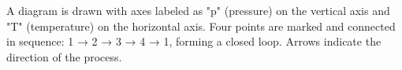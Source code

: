A diagram is drawn with axes labeled as "p" (pressure) on the vertical axis and "T" (temperature) on the horizontal axis. Four points are marked and connected in sequence: 1 → 2 → 3 → 4 → 1, forming a closed loop. Arrows indicate the direction of the process.